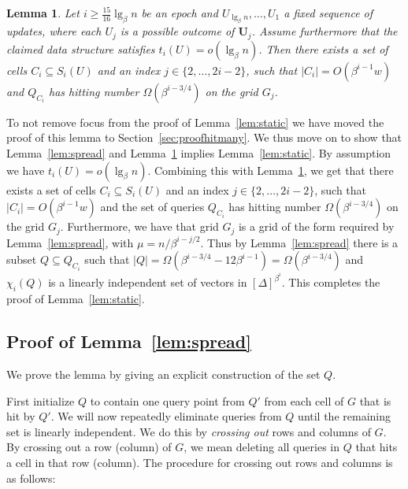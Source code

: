 \documentclass[letterpaper]{article}
\newtheorem{lemma}{Lemma}
\newcommand{\U}{\textbf{U}}
\newcommand{\inc}[1]{\chi_{#1}}
\begin{document}
\begin{lemma}
\label{lem:hitmany}
Let $i \geq \tfrac{15}{16}\lg_\beta n$ be an epoch and $U_{\lg_\beta
  n},\dots,U_1$ a fixed sequence of updates, where each $U_j$ is a
possible outcome of $\U_j$. Assume furthermore that the claimed data
structure satisfies $t_i(U) = o(\lg_\beta n)$. Then there exists a set
of cells $C_i \subseteq S_i(U)$ and an index $j \in \{2,\dots,2i-2\}$,
such that $|C_i| = O(\beta^{i-1}w)$ and $Q_{C_i}$ has hitting number
$\Omega(\beta^{i-3/4})$ on the grid $G_j$.
\end{lemma}

To not remove focus from the proof of Lemma~\ref{lem:static} we have
moved the proof of this lemma to Section~\ref{sec:proofhitmany}. We
thus move on to show that Lemma~\ref{lem:spread} and
Lemma~\ref{lem:hitmany} implies Lemma~\ref{lem:static}. By assumption
we have $t_i(U)=o(\lg_\beta n)$. Combining this with
Lemma~\ref{lem:hitmany}, we get that there exists a set of cells $C_i
\subseteq S_i(U)$ and an index $j \in \{2,\dots,2i-2\}$, such that
$|C_i| = O(\beta^{i-1}w)$ and the set of queries $Q_{C_i}$ has hitting
number $\Omega(\beta^{i-3/4})$ on the grid $G_j$. Furthermore, we have
that grid $G_j$ is a grid of the form required by
Lemma~\ref{lem:spread}, with $\mu = n/\beta^{i-j/2}$. Thus by
Lemma~\ref{lem:spread} there is a subset $Q \subseteq Q_{C_i}$ such
that $|Q| = \Omega(\beta^{i-3/4}-12\beta^{i-1}) =
\Omega(\beta^{i-3/4})$ and $\inc{i}(Q)$ is a linearly independent set
of vectors in $[\Delta]^{\beta^i}$. This completes the proof of Lemma~\ref{lem:static}.


\subsection{Proof of Lemma~\ref{lem:spread}}
\label{sec:proofspread}
We prove the lemma by giving an explicit construction of the set
$Q$. 

First initialize $Q$ to contain one query point from $Q'$ from each
cell of $G$ that is hit by $Q'$. We will now repeatedly eliminate
queries from $Q$ until the remaining set is linearly independent. We
do this by \emph{crossing out} rows and columns of $G$. By crossing
out a row (column) of $G$, we mean deleting all queries in $Q$ that
hits a cell in that row (column). The procedure for crossing out rows
and columns is as follows:
\end{document}
